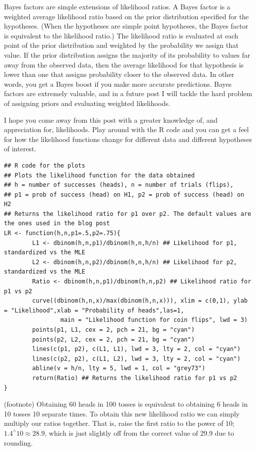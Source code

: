 Bayes factors are simple extensions of likelihood ratios. A Bayes factor is a weighted average likelihood ratio based on the prior distribution specified for the hypotheses. (When the hypotheses are simple point hypotheses, the Bayes factor is equivalent to the likelihood ratio.) The likelihood ratio is evaluated at each point of the prior distribution and weighted by the probability we assign that value. If the prior distribution assigns the majority of its probability to values far away from the observed data, then the average likelihood for that hypothesis is lower than one that assigns probability closer to the observed data. In other words, you get a Bayes boost if you make more accurate predictions. Bayes factors are extremely valuable, and in a future post I will tackle the hard problem of assigning priors and evaluating weighted likelihoods.

I hope you come away from this post with a greater knowledge of, and appreciation for, likelihoods. Play around with the R code and you can get a feel for how the likelihood functions change for different data and different hypotheses of interest.


\begin{lstlisting}
## R code for the plots
## Plots the likelihood function for the data obtained
## h = number of successes (heads), n = number of trials (flips), 
## p1 = prob of success (head) on H1, p2 = prob of success (head) on H2
## Returns the likelihood ratio for p1 over p2. The default values are the ones used in the blog post
LR <- function(h,n,p1=.5,p2=.75){
        L1 <- dbinom(h,n,p1)/dbinom(h,n,h/n) ## Likelihood for p1, standardized vs the MLE
        L2 <- dbinom(h,n,p2)/dbinom(h,n,h/n) ## Likelihood for p2, standardized vs the MLE
        Ratio <- dbinom(h,n,p1)/dbinom(h,n,p2) ## Likelihood ratio for p1 vs p2
        curve((dbinom(h,n,x)/max(dbinom(h,n,x))), xlim = c(0,1), ylab = "Likelihood",xlab = "Probability of heads",las=1,
                main = "Likelihood function for coin flips", lwd = 3)
        points(p1, L1, cex = 2, pch = 21, bg = "cyan")
        points(p2, L2, cex = 2, pch = 21, bg = "cyan")
        lines(c(p1, p2), c(L1, L1), lwd = 3, lty = 2, col = "cyan")
        lines(c(p2, p2), c(L1, L2), lwd = 3, lty = 2, col = "cyan")
        abline(v = h/n, lty = 5, lwd = 1, col = "grey73")
        return(Ratio) ## Returns the likelihood ratio for p1 vs p2
}
\end{lstlisting}

(footnote) Obtaining 60 heads in 100 tosses is equivalent to obtaining 6 heads in 10 tosses 10 separate times. To obtain this new likelihood ratio we can simply multiply our ratios together. That is, raise the first ratio to the power of 10; $1.4^{\wedge} 10 \approx 28.9$, which is just slightly off from the correct value of 29.9 due to rounding.

